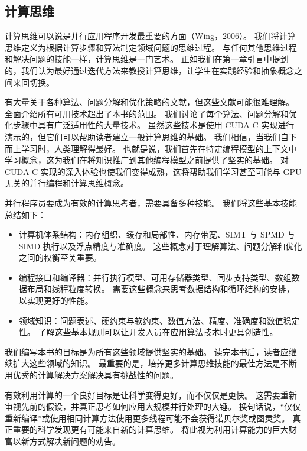\subsection{计算思维}
计算思维可以说是并行应用程序开发最重要的方面（Wing，2006）。 我们将计算思维定义为根据计算步骤和算法制定领域问题的思维过程。 与任何其他思维过程和解决问题的技能一样，计算思维是一门艺术。 正如我们在第一章引言中提到的，我们认为最好通过迭代方法来教授计算思维，让学生在实践经验和抽象概念之间来回切换。

有大量关于各种算法、问题分解和优化策略的文献，但这些文献可能很难理解。 全面介绍所有可用技术超出了本书的范围。 我们讨论了每个算法、问题分解和优化步骤中具有广泛适用性的大量技术。 虽然这些技术是使用 CUDA C 实现进行演示的，但它们可以帮助读者建立一般计算思维的基础。 我们相信，当我们自下而上学习时，人类理解得最好。 也就是说，我们首先在特定编程模型的上下文中学习概念，这为我们在将知识推广到其他编程模型之前提供了坚实的基础。 对 CUDA C 实现的深入体验也使我们变得成熟，这将帮助我们学习甚至可能与 GPU 无关的并行编程和计算思维概念。

并行程序员要成为有效的计算思考者，需要具备多种技能。 我们将这些基本技能总结如下：

\begin{itemize}
	\item 计算机体系结构：内存组织、缓存和局部性、内存带宽、SIMT 与 SPMD 与 SIMD 执行以及浮点精度与准确度。 这些概念对于理解算法、问题分解和优化之间的权衡至关重要。

	\item 编程接口和编译器：并行执行模型、可用存储器类型、同步支持类型、数组数据布局和线程粒度转换。 需要这些概念来思考数据结构和循环结构的安排，以实现更好的性能。

	\item 领域知识：问题表述、硬约束与软约束、数值方法、精度、准确度和数值稳定性。 了解这些基本规则可以让开发人员在应用算法技术时更具创造性。
\end{itemize}

我们编写本书的目标是为所有这些领域提供坚实的基础。 读完本书后，读者应继续扩大这些领域的知识。 最重要的是，培养更多计算思维技能的最佳方法是不断用优秀的计算解决方案解决具有挑战性的问题。

有效利用计算的一个良好目标是让科学变得更好，而不仅仅是更快。 这需要重新审视先前的假设，并真正思考如何应用大规模并行处理的大锤。 换句话说，“仅仅重新编译”或使用相同计算方法使用更多线程可能不会获得诺贝尔奖或图灵奖。 真正重要的科学发现更有可能来自新的计算思维。 将此视为利用计算能力的巨大财富以新方式解决新问题的劝告。

